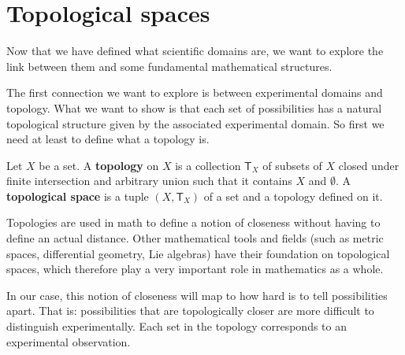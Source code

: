 \documentclass[11pt,letterpaper,fleqn]{memoir} %
\begin{document}
\section{Topological spaces}

Now that we have defined what scientific domains are, we want to explore the link between them and some fundamental mathematical structures.

The first connection we want to explore is between experimental domains and topology. What we want to show is that each set of possibilities has a natural topological structure given by the associated experimental domain. So first we need at least to define what a topology is.

\begin{mathSection}
	\begin{defn}
		Let $X$ be a set. A \textbf{topology} on $X$ is a collection $\mathsf{T}_X$ of subsets of $X$ closed under finite intersection and arbitrary union such that it contains $X$ and $\emptyset$. A \textbf{topological space} is a tuple $(X, \mathsf{T}_X)$ of a set and a topology defined on it.
	\end{defn}
\end{mathSection}

Topologies are used in math to define a notion of closeness without having to define an actual distance. Other mathematical tools and fields (such as metric spaces, differential geometry, Lie algebras) have their foundation on topological spaces, which therefore play a very important role in mathematics as a whole.

In our case, this notion of closeness will map to how hard is to tell possibilities apart. That is: possibilities that are topologically closer are more difficult to distinguish experimentally. Each set in the topology corresponds to an experimental observation.
\end{document}
